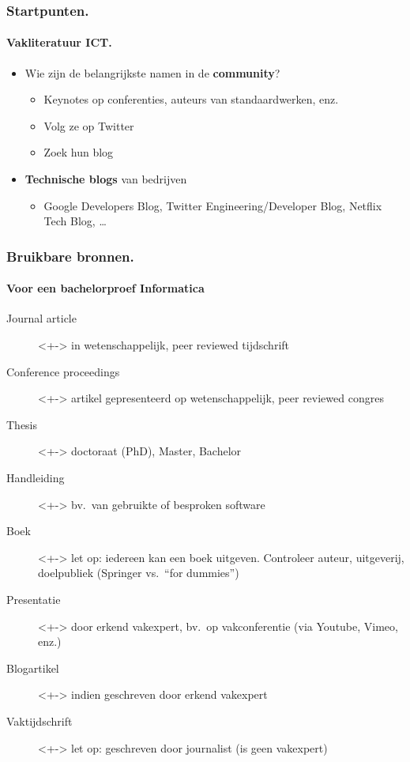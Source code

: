 \documentclass[aspectratio=169]{beamer}
\begin{document}
\begin{frame}
  \frametitle{Startpunten.}
  \framesubtitle{Vakliteratuur ICT.}

  \begin{itemize}
    \item<+-> Wie zijn de belangrijkste namen in de \textbf{community}?
    \begin{itemize}
      \item Keynotes op conferenties, auteurs van standaardwerken, enz.
      \item Volg ze op Twitter
      \item Zoek hun blog
    \end{itemize}
    \item<+-> \textbf{Technische blogs} van bedrijven
    \begin{itemize}
      \item Google Developers Blog, Twitter Engineering/Developer Blog, Netflix Tech Blog, \dots
    \end{itemize}
  \end{itemize}
\end{frame}


\begin{frame}
  \frametitle{Bruikbare bronnen.}
  \framesubtitle{Voor een bachelorproef Informatica}

  \begin{description}
    \item[Journal article]<+-> in wetenschappelijk, peer reviewed tijdschrift
    \item[Conference proceedings]<+-> artikel gepresenteerd op wetenschappelijk, peer reviewed congres
    \item[Thesis]<+-> doctoraat (PhD), Master, Bachelor
    \item[Handleiding]<+-> bv.\ van gebruikte of besproken software
    \item[Boek]<+-> let op: iedereen kan een boek uitgeven. Controleer auteur, uitgeverij, doelpubliek (Springer vs.\ ``for dummies'')
    \item[Presentatie]<+-> door erkend vakexpert, bv.\ op vakconferentie (via Youtube, Vimeo, enz.)
    \item[Blogartikel]<+-> indien geschreven door erkend vakexpert
    \item[Vaktijdschrift]<+-> let op: geschreven door journalist (is geen vakexpert)
  \end{description}
\end{frame}
\end{document}

